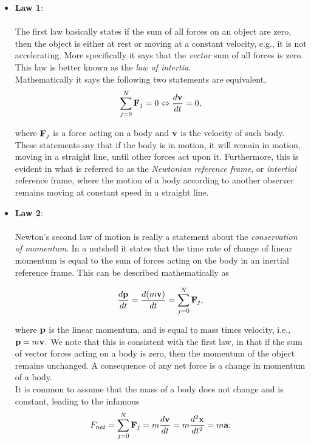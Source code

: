 \begin{itemize}

%
%
\item[] {\bf{Law 1}}: \\ \\

The first law basically states if the sum of all forces on an object are zero, then the object is either at rest or moving at a constant velocity, e.g., it is not accelerating. More specifically it says that the \emph{vector} sum of all forces is zero. This law is better known as the \emph{law of intertia}. \\ 

Mathematically it says the following two statements are equivalent,
$$\sum_{j=0}^N {\bf{F}}_j = 0  \Leftrightarrow \frac{d {\bf{v}}}{dt} = 0,$$

where ${\bf{F}}_j$ is a force acting on a body and ${\bf{v}}$ is the velocity of such body. These statements say that if the body is in motion, it will remain in motion, moving in a straight line, until other forces act upon it. Furthermore, this is evident in what is referred to as the \emph{Newtonian reference frame}, or \emph{intertial} reference frame, where the motion of a body according to another observer remains moving at constant speed in a straight line. \\

%
%
\item[] {\bf{Law 2}}: \\ \\

Newton's second law of motion is really a statement about the \emph{conservation of momentum}. In a nutshell it states that the time rate of change of linear momentum is equal to the sum of  forces acting on the body in an inertial reference frame. This can be described mathematically as

$$\frac{d{\bf{p}}}{dt} = \frac{ d(m{\bf{v}})}{dt} = \sum_{j=0}^N {\bf{F}}_j,$$

where ${\bf{p}}$ is the linear momentum, and is equal to mass times velocity, i.e., ${\bf{p}} = m{\bf{v}}.$ We note that this is consistent with the first law, in that if the sum of vector forces acting on a body is zero, then the momentum of the object remains unchanged. A consequence of any net force is a change in momentum of a body. \\

It is common to assume that the mass of a body does not change and is constant, leading to the infamous $$F_{net} = \sum_{j=0}^N {\bf{F}}_j = m \frac{d{\bf{v}}}{dt} = m \frac{d^2 {\bf{x}}}{dt^2} = m{\bf{a}};$$


\end{itemize}
